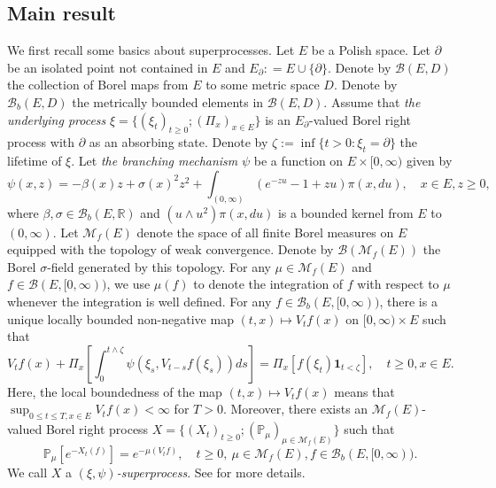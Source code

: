 \documentclass[12pt,a4paper]{amsart}
\numberwithin{equation}{section}
\theoremstyle{plain}
\theoremstyle{definition}
\theoremstyle{remark}
\begin{document}
\subsection{Main result} \label{sec:super}

	We first recall some basics about superprocesses.
	Let $E$ be a Polish space.
    Let $\partial$ be an isolated point not contained in $E$ and $E_\partial: = E \cup \{\partial\}$.
Denote by $\mathcal B(E, D)$ the collection of Borel maps  from $E$ to some metric space $D$.
    Denote by $\mathcal B_b(E,D)$ the metrically bounded elements in $\mathcal B(E,D)$.
	Assume that \emph{the underlying process} $\xi = \{(\xi_t)_{t\ge0}; (\Pi_x)_{x\in E}\}$ is an $E_\partial$-valued Borel right process with $\partial$ as an absorbing state.
Denote by $\zeta:=\inf\{t>0: \xi_t=\partial\}$ the lifetime of $\xi$.
	Let \emph{the branching mechanism} $\psi$ be a function on $E \times [0,\infty)$ given by
\begin{equation}
	\psi(x,z)
	= -\beta(x) z + \sigma(x)^2 z^2 + \int_{(0,\infty)} (e^{-zu} -1 + zu) \pi(x,du),
	\quad x\in E, z\geq 0,
\end{equation}
	where $\beta, \sigma \in \mathcal B_b(E,\mathbb R)$ and $(u \wedge u^2) \pi(x,du)$ is a bounded kernel from $E$ to $(0,\infty)$.
	Let $\mathcal M_f(E)$ denote the space of all finite Borel measures on $E$ equipped with the topology of weak convergence.
	Denote by $\mathcal B(\mathcal M_f(E))$ the Borel $\sigma$-field generated by this topology.
For any $\mu\in\mathcal M_f(E)$ and $f \in \mathcal B(E, [0,\infty))$, we use $\mu(f)$ to denote the integration of $f$ with respect to $\mu$ whenever the integration is well defined.
	For any $f \in \mathcal B_b(E, [0,\infty))$, there is a unique locally bounded non-negative map $(t,x)\mapsto V_tf(x)$ on $[0,\infty) \times E$ such that
\begin{equation} \label{eq:BGD.1}
	V_tf(x) + \Pi_x \left[ \int_0^{t\wedge \zeta} \psi \left(\xi_s, V_{t-s}f(\xi_s)\right) ds\right]
	= \Pi_x\left[ f(\xi_t)  \mathbf 1_{t < \zeta}\right], \quad t\geq 0, x\in E.
\end{equation}
	 Here, the local boundedness of the map $(t,x) \mapsto V_tf(x)$ means that $\sup_{0\leq t\leq T, x\in E} V_tf(x)< \infty$ for $T >0$.
	Moreover, there exists an $\mathcal M_f(E)$-valued Borel right process $X =\{(X_t)_{t\geq 0}; (\mathbb P_\mu)_{\mu \in \mathcal M_f(E)}\}$ such that
\begin{equation}
	\mathbb P_\mu[e^{- X_t(f)}]
	= e^{- \mu(V_tf)},
	\quad t\geq 0,~\mu \in \mathcal M_f(E), f \in \mathcal B_b(E,[0,\infty)).
\end{equation}
	We call $X$ a \emph{$(\xi, \psi)$-superprocess}.
	See \cite{Li2011MeasureValued} for more details.
\end{document}
